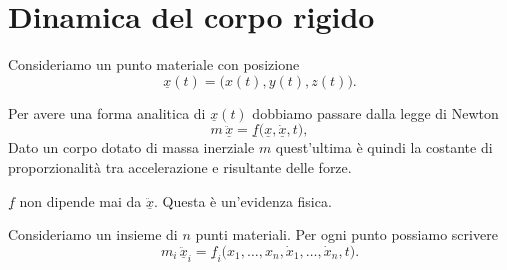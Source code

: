 \chapter{Dinamica del corpo rigido}
Consideriamo un punto materiale con posizione
\[
\underline{x}(t)=\bigl(x(t),y(t),z(t)\bigr).
\]

Per avere una forma analitica di $\underline{x}(t)$ dobbiamo passare dalla legge di Newton
\[
m\,\ddot{\underline{x}}=\underline{f}\bigl(\underline{x},\dot{\underline{x}},t\bigr),
\]
Dato un corpo dotato di massa inerziale $m$ quest'ultima è quindi la costante di proporzionalità tra accelerazione e risultante delle forze.

\begin{oss}{}
$\underline{f}$ non dipende mai da $\ddot{\underline{x}}$. Questa è un'evidenza fisica.
\end{oss}

Consideriamo un insieme di $n$ punti materiali. Per ogni punto possiamo scrivere
\[
m_i\,\ddot{\underline{x}}_i=\underline{f}_i\bigl(x_1,\dots,x_n,\dot{x}_1,\dots,\dot{x}_n,t\bigr).
\]


